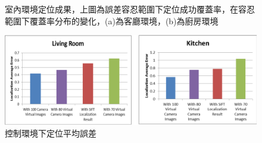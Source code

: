 \begin{figure}
	\begin{center}
	{
		}
	\end{center}
  \caption{室內環境定位成果，上圖為誤差容忍範圍下定位成功覆蓋率，在容忍範圍下覆蓋率分布的變化，(a)為客廳環境，(b)為廚房環境}
  \label{fig:Indoor_EV_and_Query}	
\end{figure}	

\begin{figure}
\begin{center}
  \includegraphics[width=1.0\textwidth]{figures/Indoor_Average_Result.eps}
  \caption{控制環境下定位平均誤差}
  \label{fig:Indoor_AVG_Error}
\end{center}
\end{figure}

